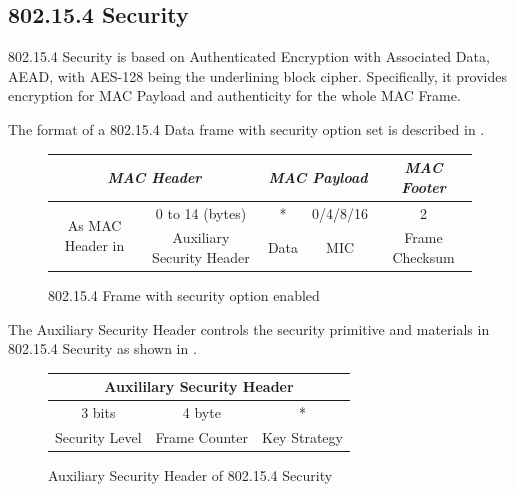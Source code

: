 \subsection{802.15.4 Security} \label{Subsec: 802154 Sec}
802.15.4 Security is based on Authenticated Encryption with Associated Data, AEAD, with AES-128 being the underlining block cipher. Specifically, it provides encryption for MAC Payload and authenticity for the whole MAC Frame.

The format of a 802.15.4 Data frame with security option set is described in .

\begin{figure}[th!]
	\centering
	\begin{tabular}{|c|c|c|c|c|c|c|}
		\multicolumn{4}{c}{\textit{MAC Header}}                                                             & \multicolumn{2}{c}{\textit{MAC Payload}} & \multicolumn{1}{c}{\textit{MAC Footer}}     \\ \hline
		\multicolumn{3}{|c|}{\multirow{2}{*}{As MAC Header in \Cref{Fig: 802154 Data Frame}}} & 0 to 14 (bytes)                    & *             & 0/4/8/16         & 2              \\ \cline{4-7} 
		\multicolumn{3}{|c|}{}                                           & Auxiliary Security Header & Data          & MIC              & Frame Checksum \\ \hline
	\end{tabular}
	\caption{802.15.4 Frame with security option enabled} \label{Fig: 802154 sec frame}
\end{figure}

The Auxiliary Security Header controls the security primitive and materials in 802.15.4 Security as shown in .

\begin{figure}[th!]
	\center
	\begin{tabular}{|c|c|c|}
	\hline
	\multicolumn{3}{|c|}{Auxililary Security Header} \\ \hline
	3 bits          & 4 byte         & *             \\ \hline
	Security Level  & Frame Counter  & Key Strategy  \\ \hline
	\end{tabular}
	\caption{Auxiliary Security Header of 802.15.4 Security}
	\label{Fig: Auxiliary Security Header of 802.15.4 Security}
\end{figure}

